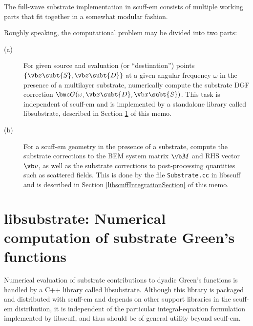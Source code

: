 \documentclass[letterpaper]{article}
\begin{document}
The full-wave substrate implementation in {\sc scuff-em} consists of
multiple working parts that fit together in a somewhat modular fashion.

Roughly speaking, the computational problem may be divided into two parts:
\begin{description}
  \item[(a)] For given source and evaluation (or ``destination'')
             points $\{\vb x\subt{S}, \vb x\subt{D}\}$ at a given 
             angular frequency
             $\omega$ in the presence of a multilayer substrate,
             numerically compute the substrate DGF correction
             $\bmc G(\omega, \vb x\subt{D}, \vb x\subt{S})$.
             This task is independent of {\sc scuff-em}
             and is implemented by a standalone library
             called {\sc libsubstrate}, described in
             Section \ref{libSubstrateSection} of this memo.
  \item[(b)] For a {\sc scuff-em} geometry in the presence of a
             substrate, compute the substrate corrections to the BEM
             system matrix $\vb M$ and RHS vector $\vb v$,
             as well as the substrate corrections
             to post-processing quantities such as scattered fields.
             This is done by the file \texttt{Substrate.cc}
             in {\sc libscuff} and is described in 
             Section \ref{libscuffIntegrationSection} of this memo.
\end{description}

\newpage
\section{{\sc libsubstrate:} Numerical computation of substrate Green's functions}
\label{libSubstrateSection}

Numerical evaluation of substrate contributions to
dyadic Green's functions is handled by a C++ library 
called {\sc libsubstrate}.
Although this library is packaged and distributed with {\sc scuff-em}
and depends on other support libraries in the {\sc scuff-em}
distribution, it is independent of the particular integral-equation
formulation implemented by {\sc libscuff}, and thus should be
of general utility beyond {\sc scuff-em}.
\end{document}
